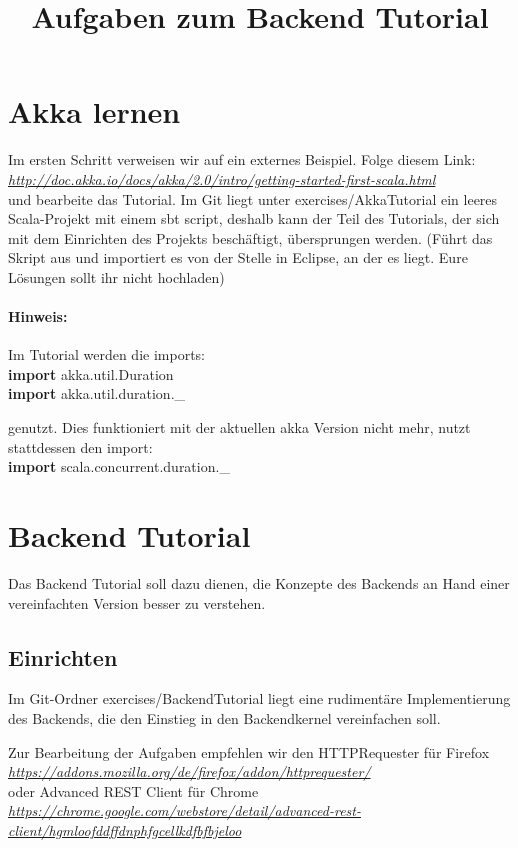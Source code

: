 \documentclass[11pt]{tudexercise}
\title{Aufgaben zum Backend Tutorial}
\newcommand{\myimport}{\textbf{import} }
\newcommand{\link}[1]{\\ \textcolor{blue}{\textit{\url{#1}}}}
\begin{document}
  \maketitle

\section{Akka lernen}
  Im ersten Schritt verweisen wir auf ein externes Beispiel.
  Folge diesem Link:
  \link{http://doc.akka.io/docs/akka/2.0/intro/getting-started-first-scala.html}\\
  und bearbeite das Tutorial. Im Git liegt unter exercises/AkkaTutorial ein leeres Scala-Projekt
  mit einem sbt script, deshalb kann der Teil des Tutorials, der sich mit dem Einrichten des Projekts
  beschäftigt, übersprungen werden.
  (Führt das Skript aus und importiert es von der Stelle in Eclipse, an der es liegt.
  Eure Lösungen sollt ihr nicht hochladen)

  \paragraph*{Hinweis:}
    Im Tutorial werden die imports:\\
    \myimport akka.util.Duration\\
    \myimport akka.util.duration.\_

    genutzt. Dies funktioniert mit der aktuellen akka Version nicht mehr, nutzt stattdessen den import:\\
    \myimport scala.concurrent.duration.\_

\section{Backend Tutorial}
  Das Backend Tutorial soll dazu dienen, die Konzepte des Backends an Hand einer vereinfachten
  Version besser zu verstehen.

  \subsection{Einrichten}
    Im Git-Ordner exercises/BackendTutorial liegt eine rudimentäre Implementierung des Backends,
    die den Einstieg in den Backendkernel vereinfachen soll.

    Zur Bearbeitung der Aufgaben empfehlen wir den HTTPRequester für Firefox
    \link{https://addons.mozilla.org/de/firefox/addon/httprequester/}\\
    oder Advanced REST Client für Chrome
    \link{https://chrome.google.com/webstore/detail/advanced-rest-client/hgmloofddffdnphfgcellkdfbfbjeloo}
\end{document}

